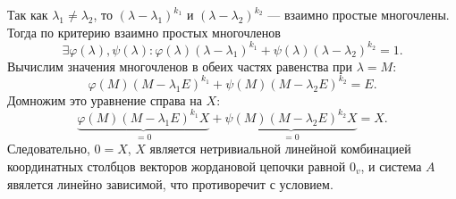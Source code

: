 \begin{enumerate}
\begin{Proof}
\begin{enumerate}
			Так как $\lambda_1 \ne \lambda_2$, то $(\lambda - \lambda_1)^{k_1}$ и $(\lambda - \lambda_2)^{k_2}$ --- взаимно простые многочлены. Тогда по критерию взаимно простых многочленов $$\exists \varphi(\lambda), \psi(\lambda) : \varphi(\lambda)(\lambda - \lambda_1)^{k_1}+\psi(\lambda)(\lambda - \lambda_2)^{k_2} = 1.$$ Вычислим значения многочленов в обеих частях равенства при $\lambda = M$: $$\varphi(M)(M-\lambda_1 E)^{k_1} + \psi(M)(M - \lambda_2 E)^{k_2} = E.$$ Домножим это уравнение справа на $X$: $$\underbrace{\varphi(M)(M-\lambda_1 E)^{k_1}X}_{=0} + \underbrace{\psi(M)(M - \lambda_2 E)^{k_2}X}_{=0} = X.$$ Следовательно, $0 = X$, $X$ является нетривиальной линейной комбинацией координатных столбцов векторов жордановой цепочки равной $0_v$, и система $A$ явялется линейно зависимой, что противоречит с условием.
		\end{enumerate}
	\end{Proof}
\end{enumerate}
